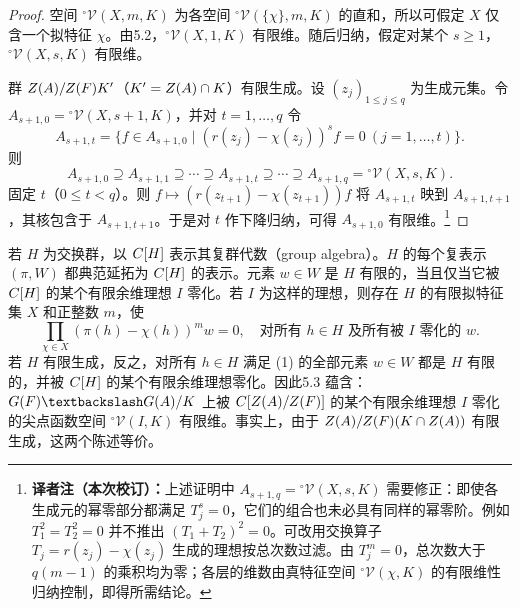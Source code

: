 \begin{proof}
空间 $^\circ\mathcal V(X,m,K)$ 为各空间 $^\circ\mathcal V(\{\chi\},m,K)$ 的直和，所以可假定 $X$ 仅含一个拟特征 $\chi$。由5.2，$^\circ\mathcal V(X,1,K)$ 有限维。随后归纳，假定对某个 $s\geq1$，$^\circ\mathcal V(X,s,K)$ 有限维。

群 $Z(A)/Z(F)K'$（$K'=Z(A)\cap K$）有限生成。设 $(z_j)_{1\leq j\leq q}$ 为生成元集。令 $A_{s+1,0}={}^\circ\mathcal V(X,s+1,K)$，并对 $t=1,\ldots,q$ 令
\[
A_{s+1,t}=\{f\in A_{s+1,0}\mid(r(z_j)-\chi(z_j))^s f=0\ (j=1,\ldots,t)\}.
\]
则
\[
A_{s+1,0}\supseteq A_{s+1,1}\supseteq\cdots\supseteq A_{s+1,t}\supseteq\cdots\supseteq A_{s+1,q}={}^\circ\mathcal V(X,s,K).
\]
固定 $t$（$0\leq t<q$）。则 $f\mapsto(r(z_{t+1})-\chi(z_{t+1}))f$ 将 $A_{s+1,t}$ 映到 $A_{s+1,t+1}$，其核包含于 $A_{s+1,t+1}$。于是对 $t$ 作下降归纳，可得 $A_{s+1,0}$ 有限维。\footnote{\textbf{译者注（本次校订）：}上述证明中 $A_{s+1,q}={}^\circ\mathcal V(X,s,K)$ 需要修正：即使各生成元的幂零部分都满足 $T_j^s=0$，它们的组合也未必具有同样的幂零阶。例如 $T_1^2=T_2^2=0$ 并不推出 $(T_1+T_2)^2=0$。可改用交换算子 $T_j=r(z_j)-\chi(z_j)$ 生成的理想按总次数过滤。由 $T_j^m=0$，总次数大于 $q(m-1)$ 的乘积均为零；各层的维数由真特征空间 $^\circ\mathcal V(\chi,K)$ 的有限维性归纳控制，即得所需结论。}
\end{proof}
若 $H$ 为交换群，以 $C[H]$ 表示其复群代数（group algebra）。$H$ 的每个复表示 $(\pi,W)$ 都典范延拓为 $C[H]$ 的表示。元素 $w\in W$ 是 $H$ 有限的，当且仅当它被 $C[H]$ 的某个有限余维理想 $I$ 零化。若 $I$ 为这样的理想，则存在 $H$ 的有限拟特征集 $X$ 和正整数 $m$，使
\[
\prod_{\chi\in X}(\pi(h)-\chi(h))^m w=0,\quad\text{对所有 }h\in H\text{ 及所有被 }I\text{ 零化的 }w.\tag{1}
\]
若 $H$ 有限生成，反之，对所有 $h\in H$ 满足 (1) 的全部元素 $w\in W$ 都是 $H$ 有限的，并被 $C[H]$ 的某个有限余维理想零化。因此5.3 蕴含：$G(F)\backslash G(\A)/K$ 上被 $C[Z(A)/Z(F)]$ 的某个有限余维理想 $I$ 零化的尖点函数空间 $^\circ\mathcal V(I,K)$ 有限维。事实上，由于 $Z(A)/Z(F)(K\cap Z(A))$ 有限生成，这两个陈述等价。

